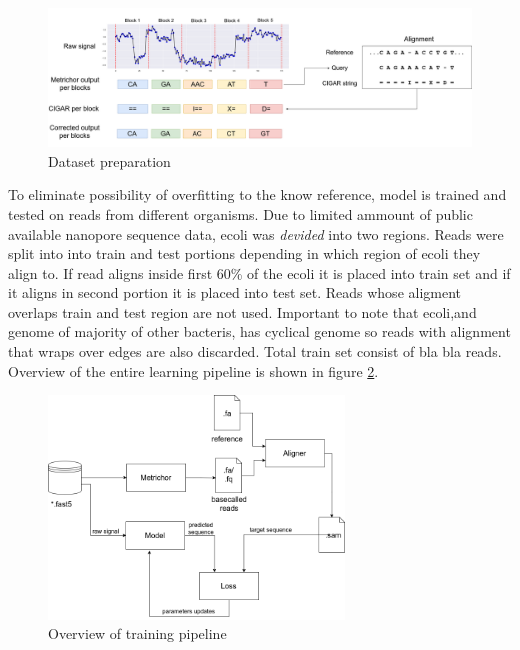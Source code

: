 \documentclass[times, utf8, diplomski, numeric, english]{fer}
\begin{document}
\begin{figure}[!ht]
	\begin{center}
		\includegraphics[width=1\textwidth]{./imgs/train_data_correction.png}
		\caption{Dataset preparation}
		\label{fg:data_correction}
	\end{center}
\end{figure}


To eliminate possibility of overfitting to the know reference, model is trained and tested on reads from different organisms. Due to limited ammount of public available nanopore sequence data, ecoli was \textit{devided} into two regions.
Reads were split into into train and test portions depending in which region of ecoli they align to. 
If read aligns inside first 60\% of the ecoli it is placed into train set and if it aligns in second portion it is placed into test set. Reads whose aligment overlaps train and test region are not used. Important to note that ecoli,and genome of majority of other bacteris, has cyclical genome so reads with alignment that wraps over edges are also discarded. Total train set consist of bla bla reads.
Overview of the entire learning pipeline is shown in figure \ref{fg:train_pipe}.
\begin{figure}[!ht]
	\begin{center}
		\includegraphics[width=0.7\textwidth]{./imgs/train_pipeline.png}
		\caption{Overview of training pipeline}
		\label{fg:train_pipe}
	\end{center}
\end{figure}
\end{document}
